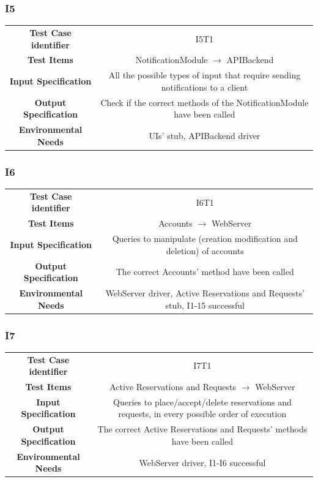 \documentclass{article}
\begin{document}
\subsubsection{I5}
\begin{adjustbox}{width=1.2\textwidth}	
	\begin{tabular}{*{2}{c}}
		\toprule
		\textbf{Test Case identifier} & I5T1\\
		\textbf{Test Items} & NotificationModule $\rightarrow$ APIBackend\\
		\textbf{Input Specification} & All the possible types of input that require sending notifications to a client \\ 
		\textbf{Output Specification} & Check if the correct methods of the NotificationModule have been called\\
		\textbf{Environmental Needs} & UIs' stub, APIBackend driver\\
		\bottomrule
	\end{tabular}
\end{adjustbox}
\subsubsection{I6}
\begin{adjustbox}{width=1.2\textwidth}	
	\begin{tabular}{*{2}{c}}
		\toprule
		\textbf{Test Case identifier} & I6T1\\
		\textbf{Test Items} & Accounts $\rightarrow$ WebServer\\
		\textbf{Input Specification} & Queries to manipulate (creation modification and deletion) of accounts\\
		\textbf{Output Specification} & The correct Accounts' method have been called\\
		\textbf{Environmental Needs} & WebServer driver, Active Reservations and Requests' stub, I1-15 successful\\
		\bottomrule
	\end{tabular}
\end{adjustbox}
\subsubsection{I7}
\begin{adjustbox}{width=1.2\textwidth}	
	\begin{tabular}{*{2}{c}}
		\toprule
		\textbf{Test Case identifier} & I7T1\\
		\textbf{Test Items} & Active Reservations and Requests $\rightarrow$ WebServer\\
		\textbf{Input Specification} & Queries to place/accept/delete reservations and requests, in every possible order of execution\\ 
		\textbf{Output Specification} & The correct Active Reservations and Requests' methods have been called\\
		\textbf{Environmental Needs} & WebServer driver, I1-I6 successful\\
		\bottomrule
	\end{tabular}
\end{adjustbox}
\end{document}
